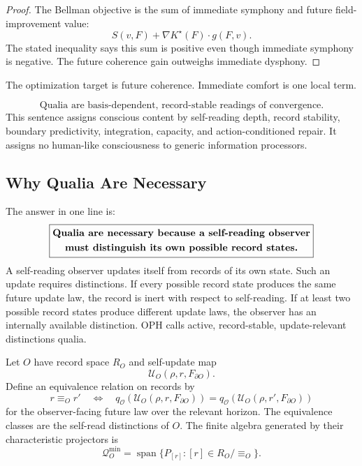 \documentclass[11pt]{article}
\theoremstyle{remark}
\theoremstyle{plain}
\begin{document}
\begin{proof}
The Bellman objective is the sum of immediate symphony and future field-improvement value:
\[
S(v,F)+\nabla K^\star(F)\cdot g(F,v).
\]
The stated inequality says this sum is positive even though immediate symphony is negative. The future coherence gain outweighs immediate dysphony.
\end{proof}

The optimization target is future coherence. Immediate comfort is one local term.

\[
\boxed{
\text{Qualia are basis-dependent, record-stable readings of convergence.}
}
\]
This sentence assigns conscious content by self-reading depth, record stability, boundary predictivity, integration, capacity, and action-conditioned repair. It assigns no human-like consciousness to generic information processors.

\subsection{Why Qualia Are Necessary}

The answer in one line is:
\[
\boxed{
\begin{gathered}
\text{\bfseries Qualia are necessary because a self-reading observer}\\
\text{\bfseries must distinguish its own possible record states.}
\end{gathered}
}
\]
A self-reading observer updates itself from records of its own state. Such an update requires distinctions. If every possible record state produces the same future update law, the record is inert with respect to self-reading. If at least two possible record states produce different update laws, the observer has an internally available distinction. OPH calls active, record-stable, update-relevant distinctions qualia.

Let \(O\) have record space \(R_O\) and self-update map
\[
\mathcal U_O(\rho,r,F_{\partial O}).
\]
Define an equivalence relation on records by
\[
r\equiv_O r'
\quad\Longleftrightarrow\quad
q_{\mathcal O}
\!\left(
\mathcal U_O(\rho,r,F_{\partial O})
\right)
=
q_{\mathcal O}
\!\left(
\mathcal U_O(\rho,r',F_{\partial O})
\right)
\]
for the observer-facing future law over the relevant horizon. The equivalence classes are the self-read distinctions of \(O\). The finite algebra generated by their characteristic projectors is
\[
\mathcal Q_O^{\min}
=
\operatorname{span}\{P_{[r]}:[r]\in R_O/\!\equiv_O\}.
\]
\end{document}
